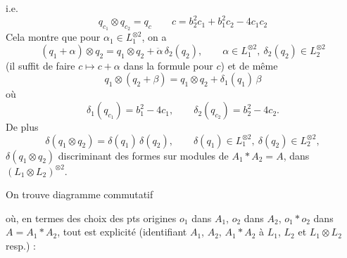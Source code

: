 \documentclass[11pt,a4paper]{article}
\begin{document}
i.e.
\[
  q_{c_1} \otimes q_{c_2} = q_c \qquad c = b_2^2 c_1 + b_1^2 c_2 - 4 c_1 c_2
\]
Cela montre que pour $\alpha_1 \in L_1^{\otimes 2}$, on a
\[
  (q_1 + \alpha) \otimes q_2 = q_1 \otimes q_2 + \ddot{\alpha}\, \delta_2(q_2),
  \qquad \alpha \in L_1^{\otimes 2},\ \delta_2(q_2) \in L_2^{\otimes 2}
\]
(il suffit de faire $c \mapsto c + \alpha$ dans la formule pour $c$) et de même
\[
  q_1 \otimes (q_2 + \beta) = q_1 \otimes q_2 + \delta_1(q_1)\, \beta
\]
où
\[
  \delta_1(q_{c_1}) = b_1^2 - 4 c_1, \qquad \delta_2(q_{c_2}) = b_2^2 - 4 c_2 .
\]
 De plus
\[
  \delta(q_1 \otimes q_2) = \delta(q_1)\, \delta(q_2),
  \qquad \delta(q_1) \in L_1^{\otimes 2},\ \delta(q_2) \in L_2^{\otimes 2},
\]
$\delta(q_1\otimes q_2)$ discriminant des formes sur modules  de $A_1 \ast A_2 = A$, dans $(L_1 \otimes L_2)^{\otimes 2}$.

On trouve diagramme commutatif\supplied{]}


où, en termes des  choix des pts origines $o_1$ dans $A_1$, $o_2$ dans $A_2$, $o_1 \ast o_2$ dans $A = A_1 \ast A_2$, tout est explicité (identifiant $A_1$, $A_2$, $A_1 \ast A_2$ à $L_1$, $L_2$ et $L_1 \otimes L_2$ resp.) :
\end{document}

